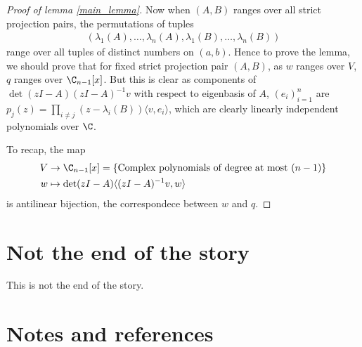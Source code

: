 \begin{proof}[Proof of lemma \ref{main_lemma}]
	Now when $(A, B)$ ranges over all strict projection pairs, the permutations of tuples
	\begin{align}
	(\lambda_{1}(A), \ldots, \lambda_{n}(A), \lambda_{1}(B), \ldots, \lambda_{n}(B))
	\end{align}
	range over all tuples of distinct numbers on $(a, b)$. Hence to prove the lemma, we should prove that for fixed strict projection pair $(A, B)$, as $w$ ranges over $V$, $q$ ranges over $\C_{n - 1}[x]$. But this is clear as components of $\det(z I - A)(z I - A)^{-1} v$ with respect to eigenbasis of $A$, $(e_{i})_{i = 1}^{n}$ are $p_{j}(z) = \prod_{i \neq j}(z - \lambda_{i}(B)) \langle v, e_{i} \rangle$, which are clearly linearly independent polynomials over $\C$.

	To recap, the map
	\begin{align*}
		V &\to \C_{n - 1}[x] = \{\text{Complex polynomials of degree at most } (n - 1) \} \\
		w &\mapsto \det(z I - A) \langle (z I - A)^{-1} v, w \rangle
	\end{align*}
	is antilinear bijection, the correspondece between $w$ and $q$.
\end{proof}

\section{Not the end of the story}

This is not the end of the story.

\section{Notes and references}

